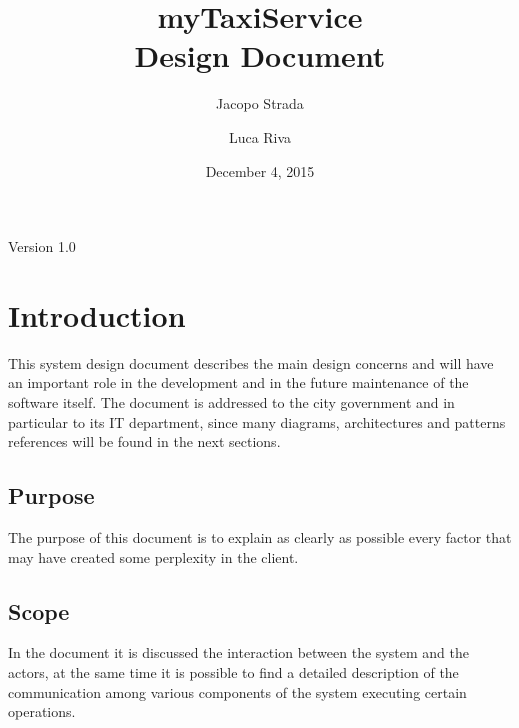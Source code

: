 \documentclass[a4paper]{article}
\title{{\Huge myTaxiService} \\ Design Document}
\author{Jacopo Strada \and Luca Riva}
\date{December 4, 2015}
\begin{document}
\maketitle
\vfill
\begin{flushright}
Version 1.0
\end{flushright}

\newpage

\tableofcontents

\newpage

\vfill

\listoffigures 

\vfill

\listoftables

\vfill

\listofalgorithms

\vfill

\let\stdsection\section
\renewcommand\section{\newpage\stdsection}

\setlength{\parindent}{0em}
\setlength{\parskip}{1em}

\section{Introduction}
This system design document describes the main design concerns and will have an important role in the development and in the future maintenance of the software itself. The document is addressed to the city government and in particular to its IT department, since many diagrams, architectures and patterns references will be found in the next sections.

\subsection{Purpose}
The purpose of this document is to explain as clearly as possible every factor that may have created some perplexity in the client.

\subsection{Scope}
In the document it is discussed the interaction between the system and the actors, at the same time it is possible to find a detailed description of the communication among various components of the system executing certain operations.
\end{document}
